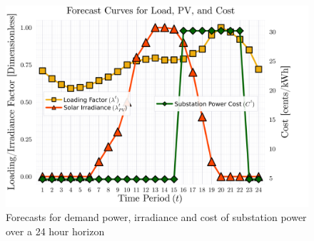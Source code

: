 \documentclass[../../outputs/main.tex]{subfiles}
\begin{document}


\begin{figure}[t]
    \centering
    \includegraphics[height=0.20\textheight]{../figures/T24-inputCurves/Horizon_24_InputForecastCurves_bilevelCosts.png}
    \caption{Forecasts for demand power, irradiance and cost of substation power over a 24 hour horizon}
    \label{fig:inputCurve-5}
    \vspace{-4mm}
\end{figure}

\def\ds{\rule{0pt}{1.5ex}} %





\end{document}
